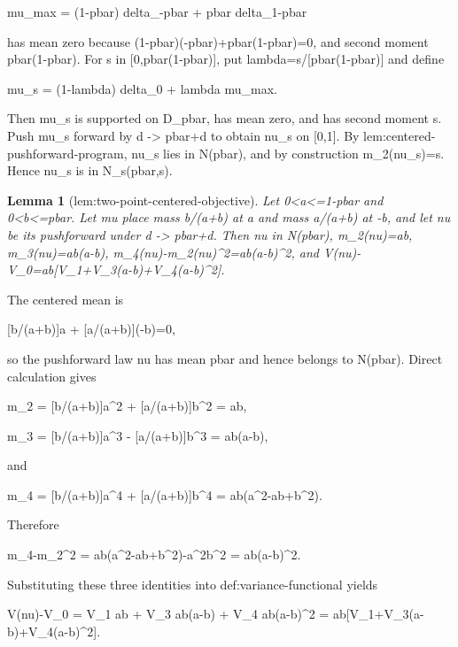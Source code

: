 \documentclass{article}
\newtheorem{lemma}{Lemma}
\begin{document}
mu_max = (1-pbar) delta_{-pbar} + pbar delta_{1-pbar}

has mean zero because (1-pbar)(-pbar)+pbar(1-pbar)=0, and second moment pbar(1-pbar). For s in [0,pbar(1-pbar)], put lambda=s/[pbar(1-pbar)] and define

mu_s = (1-lambda) delta_0 + lambda mu_max.

Then mu_s is supported on D_pbar, has mean zero, and has second moment s. Push mu_s forward by d -> pbar+d to obtain nu_s on [0,1]. By lem:centered-pushforward-program, nu_s lies in N(pbar), and by construction m_2(nu_s)=s. Hence nu_s is in N_s(pbar,s).

\begin{lemma}[lem:two-point-centered-objective]\label{lem:two-point-centered-objective}
Let 0<a<=1-pbar and 0<b<=pbar. Let mu place mass b/(a+b) at a and mass a/(a+b) at -b, and let nu be its pushforward under d -> pbar+d. Then nu in N(pbar), m_2(nu)=ab, m_3(nu)=ab(a-b), m_4(nu)-m_2(nu)^2=ab(a-b)^2, and V(nu)-V_0=ab[V_1+V_3(a-b)+V_4(a-b)^2].
\end{lemma}
The centered mean is

[b/(a+b)]a + [a/(a+b)](-b)=0,

so the pushforward law nu has mean pbar and hence belongs to N(pbar). Direct calculation gives

m_2 = [b/(a+b)]a^2 + [a/(a+b)]b^2 = ab,

m_3 = [b/(a+b)]a^3 - [a/(a+b)]b^3 = ab(a-b),

and

m_4 = [b/(a+b)]a^4 + [a/(a+b)]b^4 = ab(a^2-ab+b^2).

Therefore

m_4-m_2^2 = ab(a^2-ab+b^2)-a^2b^2 = ab(a-b)^2.

Substituting these three identities into def:variance-functional yields

V(nu)-V_0 = V_1 ab + V_3 ab(a-b) + V_4 ab(a-b)^2 = ab[V_1+V_3(a-b)+V_4(a-b)^2].
\end{document}
